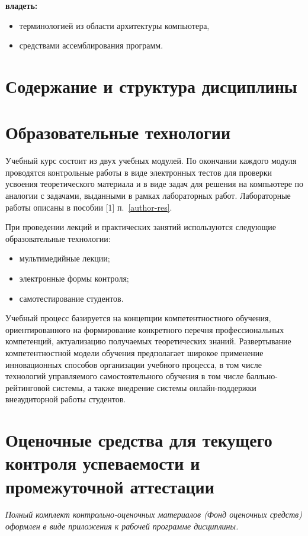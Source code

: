 \noindent\textbf{владеть:}
	\begin{itemize}[topsep=1mm]
		\item терминологией из области архитектуры компьютера,
		\item средствами ассемблирования программ.
	\end{itemize}

\section{Содержание и структура дисциплины}


\section{Образовательные технологии}

Учебный курс состоит из двух учебных модулей. По окончании каждого модуля проводятся контрольные работы в виде электронных тестов для проверки усвоения теоретического материала и в виде задач для решения на компьютере по аналогии с задачами, выданными в рамках лабораторных работ. Лабораторные работы описаны в пособии [1] п.~\ref{author-res}.

При проведении лекций и практических занятий используются следующие образовательные технологии:
\begin{itemize}
	\item мультимедийные лекции;
	\item электронные формы контроля;
	\item самотестирование студентов.
\end{itemize}

Учебный процесс базируется на концепции компетентностного обучения, ориентированного на формирование конкретного перечня профессиональных компетенций, актуализацию получаемых теоретических знаний. Развертывание компетентностной модели обучения предполагает широкое применение инновационных способов организации учебного процесса, в том числе технологий управляемого самостоятельного обучения в том числе балльно-рейтинговой системы, а также внедрение системы онлайн-поддержки внеаудиторной работы студентов.

\section{Оценочные средства для текущего контроля успеваемости и промежуточной аттестации}

\emph{Полный комплект контрольно-оценочных материалов (Фонд оценочных средств) оформлен в виде приложения к рабочей программе дисциплины.}

